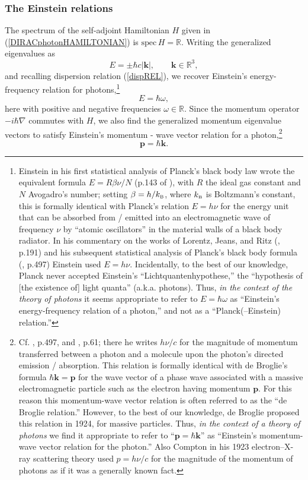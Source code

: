 \documentclass[12pt]{article}
\theoremstyle{definition}
\newcommand{\refeq}[1]{(\ref{#1})}
\newcommand{\vect}[1] {\boldsymbol{{ #1}} }
\newcommand{\kV}{{\vect{k}}}		%
\newcommand{\pV}{{\vect{p}}}            %
\numberwithin{equation}{section}
\newcommand{\beq}{\begin{equation}}
\newcommand{\eeq}{\end{equation}}
\newcommand{\Rset}{{\mathbb R}}
\newcommand{\nab}{\nabla}
\begin{document}
\subsubsection{The Einstein relations}\vspace{-5pt}

 The spectrum of the self-adjoint Hamiltonian $H$ given in \refeq{DIRACphotonHAMILTONIAN} is ${\mathrm{spec}\,}H=\Rset$.
 Writing the generalized eigenvalues as
\beq 
\label{HAMILTONIANspec}
E=\pm \hbar c|\kV|, \qquad \kV\in\Rset^3,
\eeq
and recalling dispersion relation \refeq{dispREL}, we recover Einstein's energy-frequency relation for photons,\footnote{Einstein 
  in his first statistical analysis of Planck's 
  black body law wrote  the equivalent formula $E=R\beta\nu/N$ (p.143 of \cite{EinsteinPHOTONa}), with $R$ the ideal gas constant and 
  $N$ Avogadro's number; setting $\beta=h/k_{\mbox{\tiny{B}}}$, where $k_{\mbox{\tiny{B}}}$ is Boltzmann's constant, this is formally 
  identical with Planck's relation $E=h\nu$ for the energy unit that can be absorbed from / emitted into an 
  electromagnetic wave of frequency $\nu$ by ``atomic oscillators'' in the material walls of a black body radiator.
    In his commentary on the works of Lorentz, Jeans, and Ritz (\cite{EinsteinPHOTONb}, p.191) and his 
  subsequent statistical analysis of Planck's black body formula (\cite{EinsteinPHOTONbb}, p.497) Einstein used $E=h\nu$. 
    Incidentally, to the best of our knowledge, Planck never accepted Einstein's ``Lichtquantenhypothese,'' the ``hypothesis of 
  [the existence of] light quanta'' (a.k.a. photons).
    Thus, \emph{in the context of the theory of photons} it seems appropriate to refer to $E=\hbar\omega$ as 
 ``Einstein's energy-frequency relation of a photon,'' and not as a ``Planck(--Einstein) relation.''}
\beq 
\label{EinsteinEomega}
E=\hbar \omega,
\eeq
here with positive and negative frequencies $\omega\in\Rset$.
 Since the momentum operator $-i\hbar\nab$ commutes with $H$, we also find the generalized momentum eigenvalue vectors to
satisfy Einstein's momentum - wave vector relation for a photon,\footnote{Cf. \cite{EinsteinPHOTONbb}, p.497, 
and \cite{EinsteinPHOTONc},  p.61; there he writes $h\nu/c$ for the magnitude of momentum transferred between a photon and 
 a molecule upon the photon's directed emission / absorption. 
   This relation is formally identical with de Broglie's formula
 $\hbar\kV =\pV$ for the wave vector of a phase wave associated with a massive electromagnetic particle such as the electron 
 having  momentum $\pV$.
   For this reason this momentum-wave vector relation is often referred to as the ``de Broglie relation.''
   However, to the best of our knowledge, de Broglie proposed this relation  in 1924, for massive particles. 
   Thus, \emph{in the context of a theory of photons} we find it appropriate to refer to ``$\pV=\hbar\kV$'' 
 as ``Einstein's momentum-wave vector relation for the photon.''
   Also Compton in his 1923 electron--X-ray scattering theory  \cite{Compton} 
 used $p=h\nu/c$ for the magnitude of the momentum of photons as if it was a generally known fact.}
\beq 
\label{EinsteinPk}
\pV=\hbar\kV.
\eeq
\end{document}
